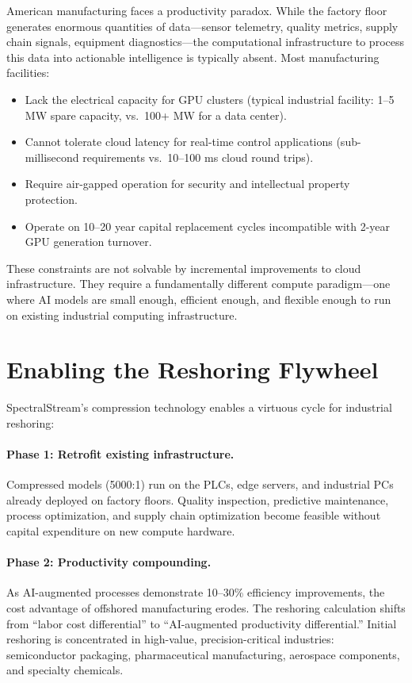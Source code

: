\documentclass[11pt,a4paper,openright]{book}
\begin{document}
American manufacturing faces a productivity paradox. While the factory floor generates enormous quantities of data---sensor telemetry, quality metrics, supply chain signals, equipment diagnostics---the computational infrastructure to process this data into actionable intelligence is typically absent. Most manufacturing facilities:

\begin{itemize}
	\item Lack the electrical capacity for GPU clusters (typical industrial facility: 1--5 MW spare capacity, vs.\ 100+ MW for a data center).
	\item Cannot tolerate cloud latency for real-time control applications (sub-millisecond requirements vs.\ 10--100 ms cloud round trips).
	\item Require air-gapped operation for security and intellectual property protection.
	\item Operate on 10--20 year capital replacement cycles incompatible with 2-year GPU generation turnover.
\end{itemize}

These constraints are not solvable by incremental improvements to cloud infrastructure. They require a fundamentally different compute paradigm---one where AI models are small enough, efficient enough, and flexible enough to run on existing industrial computing infrastructure.

\section{Enabling the Reshoring Flywheel}

SpectralStream's compression technology enables a virtuous cycle for industrial reshoring:

\paragraph{Phase 1: Retrofit existing infrastructure.}
Compressed models (5000:1) run on the PLCs, edge servers, and industrial PCs already deployed on factory floors. Quality inspection, predictive maintenance, process optimization, and supply chain optimization become feasible without capital expenditure on new compute hardware.

\paragraph{Phase 2: Productivity compounding.}
As AI-augmented processes demonstrate 10--30\% efficiency improvements, the cost advantage of offshored manufacturing erodes. The reshoring calculation shifts from ``labor cost differential'' to ``AI-augmented productivity differential.'' Initial reshoring is concentrated in high-value, precision-critical industries: semiconductor packaging, pharmaceutical manufacturing, aerospace components, and specialty chemicals.
\end{document}
